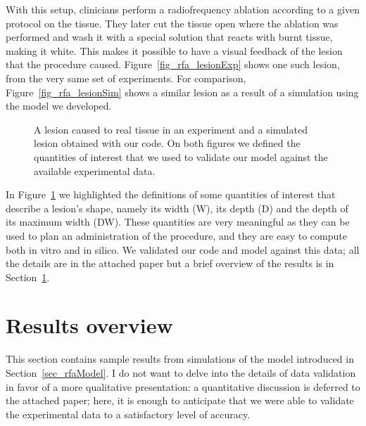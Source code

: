 With this setup, clinicians perform a radiofrequency ablation according to a given protocol on the tissue.
They later cut the tissue open where the ablation was performed and wash it with a special solution that reacts with burnt tissue, making it white.
This makes it possible to have a visual feedback of the lesion that the procedure caused.
Figure~\ref{fig_rfa_lesionExp} shows one such lesion, from the very same set of experiments.
For comparison, Figure~\ref{fig_rfa_lesionSim} shows a similar lesion as a result of a simulation using the model we developed.
\begin{figure}
  \centering
    \quad
    \caption{A lesion caused to real tissue in an experiment and a simulated lesion obtained with our code. On both figures we defined the quantities of interest that we used to validate our model against the available experimental data.}
    \label{fig_rfa_lesions}
\end{figure}
In Figure~\ref{fig_rfa_lesions} we highlighted the definitions of some quantities of interest that describe a lesion's shape, namely its width (W), its depth (D) and the depth of its maximum width (DW).
These quantities are very meaningful as they can be used to plan an administration of the procedure, and they are easy to compute both in vitro and in silico.
We validated our code and model against this data; all the details are in the attached paper but a brief overview of the results is in Section~\ref{sec_rfaResults}.

\section{Results overview}
\label{sec_rfaResults}
This section contains sample results from simulations of the model introduced in Section~\ref{sec_rfaModel}.
I do not want to delve into the details of data validation in favor of a more qualitative presentation: a quantitative discussion is deferred to the attached paper; here, it is enough to anticipate that we were able to validate the experimental data to a satisfactory level of accuracy.

